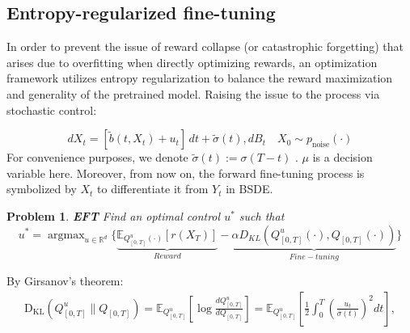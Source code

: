 \documentclass[11pt]{article}
\newtheorem{problem}{Problem}[section]
\def\w{\widetilde}
\begin{document}


\subsection{Entropy-regularized fine-tuning}
In order to prevent the issue of reward collapse (or catastrophic forgetting) that arises due to overfitting when directly optimizing rewards, an optimization framework utilizes entropy regularization to balance the reward maximization and generality of the pretrained model. Raising the issue to the process via stochastic control:

\begin{equation}
\label{state}
d X_t = [\w{b}(t,{X}_t)+u_t ]\, dt +  \w{\sigma}(t), dB_t
\quad X_0 \sim  p_{\text{noise}}(\cdot)
\end{equation}
For convenience purposes, we denote $\w{\sigma}(t) := \sigma(T-t)$ . $\mu$ is a decision variable here. Moreover, from now on, the forward fine-tuning process is symbolized by $X_t$ to differentiate it from $Y_t$ in BSDE. 

\begin{problem}\textbf{EFT} 
Find an optimal control $u^*$ such that
\begin{equation}
u^{*}=\operatorname{argmax}_{u \in \mathbb{R}^d} \{\underbrace{\mathbb{E}_{Q^{u}_{[0,T]}(\cdot)}[r(X_T)]}_{Reward}
-\underbrace{\alpha D_{KL}(Q^{u}_{[0,T]}(\cdot),Q_{[0,T]}(\cdot))}_{Fine-tuning}\}
\end{equation}

    
    
\end{problem}


    


By Girsanov’s theorem:
\begin{align*}
\mathrm{D_{KL}}(Q^{u}_{[0,T]} \| Q_{[0,T]}) 
= \mathbb{E}_{Q^{u}_{[0,T]}} \left[ 
\log \frac{dQ^{u}_{[0,T]}}{dQ_{[0,T]}} 
\right]= \mathbb{E}_{Q^{u}_{[0,T]}} \left[ 
\frac{1}{2} \int_0^T \left( \frac{u_t}{\bar{\sigma}(t)} \right)^2 dt 
\right],
\end{align*}
\end{document}
